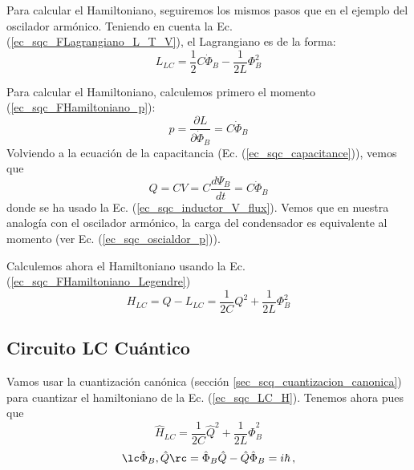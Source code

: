         Para calcular el Hamiltoniano, seguiremos los mismos pasos que en el ejemplo del oscilador armónico. Teniendo en cuenta la Ec. 
        (\ref{ec_sqc_FLagrangiano_L_T_V}), el Lagrangiano es de la forma:
        \begin{equation} \label{ec_sqc_LC_L}
            L_{LC} = \frac{1}{2} C \dot{\Phi}_B - \frac{1}{2L} \Phi_B^2
        \end{equation}
    
        Para calcular el Hamiltoniano, calculemos primero el momento (\ref{ec_sqc_FHamiltoniano_p}):
        \begin{equation}
            p = \frac{\partial L}{\partial \dot{\Phi}_B} = C  \dot{\Phi}_B
        \end{equation}
        Volviendo a la ecuación de la capacitancia (Ec. (\ref{ec_sqc_capacitance})), vemos que
        \begin{equation}
            Q = C V = C \frac{d \Psi_B}{dt} = C \dot{\Phi}_B
        \end{equation}
        donde se ha usado la Ec. (\ref{ec_sqc_inductor_V_flux}). Vemos que en nuestra analogía con el oscilador armónico, la carga del condensador es equivalente al momento (ver Ec. (\ref{ec_sqc_oscialdor_p})).
                
        Calculemos ahora el Hamiltoniano usando la Ec. (\ref{ec_sqc_FHamiltoniano_Legendre})
        \begin{equation} \label{ec_sqc_LC_H}
            H_{LC} = Q - L_{LC} = \frac{1}{2C} Q^2 + \frac{1}{2L} \Phi_B^2  
        \end{equation}
    
        





    \subsection{Circuito LC Cuántico} \label{sec_scq_circuito_LC_cuantico}


        Vamos usar la cuantización canónica (sección \ref{sec_scq_cuantizacion_canonica}) para cuantizar el hamiltoniano de la Ec. (\ref{ec_sqc_LC_H}). Tenemos ahora pues que
        \begin{equation} \label{ec_sqc_LC_cuantico_H_1}
            \hat{H}_{LC} = \frac{1}{2C} \hat{Q}^2 + \frac{1}{2L} \hat{\Phi}_B^2  
        \end{equation}
        \begin{equation}
            \lc \hat{\Phi}_B, \hat{Q} \rc = \hat{\Phi}_B \hat{Q} - \hat{Q} \hat{\Phi}_B = i \hbar \, ,
        \end{equation}

